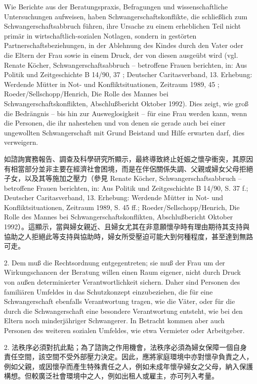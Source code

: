 \documentclass[12pt]{article}
\begin{document}
\begin{sourcepara}[title={原文D.153}]
Wie Berichte aus der Beratungspraxis, Befragungen und wissenschaftliche Untersuchungen aufweisen, haben Schwangerschaftskonflikte, die schließlich zum Schwangerschaftsabbruch führen, ihre Ursache zu einem erheblichen Teil nicht primär in wirtschaftlich-sozialen Notlagen, sondern in gestörten Partnerschaftsbeziehungen, in der Ablehnung des Kindes durch den Vater oder die Eltern der Frau sowie in einem Druck, der von diesen ausgeübt wird (vgl. Renate Köcher, Schwangerschaftsabbruch -- betroffene Frauen berichten, in: Aus Politik und Zeitgeschichte B 14/90, \abbrS{} 37 \abbrF{}; Deutscher Caritasverband, 13. Erhebung: Werdende Mütter in Not- und Konfliktsituationen, Zeitraum 1989, \abbrS{} 45 \abbrFF{}; Roeder/Sellschopp/Henrich, Die Rolle des Mannes bei Schwangerschaftskonflikten, Abschlußbericht Oktober 1992). Dies zeigt, wie groß die Bedrängnis -- bis hin zur Ausweglosigkeit -- für eine Frau werden kann, wenn die Personen, die ihr nahestehen und von denen sie gerade auch bei einer ungewollten Schwangerschaft mit Grund Beistand und Hilfe erwarten darf, dies verweigern.
\end{sourcepara}
\begin{transpara}
如諮詢實務報告、調查及科學研究所顯示，最終導致終止妊娠之懷孕衝突，其原因有相當部分並非主要在經濟社會困境，而是在伴侶關係失調、父親或婦女父母拒絕子女，以及其等施加之壓力（參見 Renate Köcher, Schwangerschaftsabbruch -- betroffene Frauen berichten, in: Aus Politik und Zeitgeschichte B 14/90, S. 37 f.; Deutscher Caritasverband, 13. Erhebung: Werdende Mütter in Not- und Konfliktsituationen, Zeitraum 1989, S. 45 ff.; Roeder/Sellschopp/Henrich, Die Rolle des Mannes bei Schwangerschaftskonflikten, Abschlußbericht Oktober 1992）。這顯示，當與婦女親近、且婦女尤其在非意願懷孕時有理由期待其支持與協助之人拒絕此等支持與協助時，婦女所受壓迫可能大到何種程度，甚至達到無路可走。
\end{transpara}

\begin{sourcepara}[title={原文D.154}]
2. Dem muß die Rechtsordnung entgegentreten; sie muß der Frau um der Wirkungschancen der Beratung willen einen Raum eigener, nicht durch Druck von außen determinierter Verantwortlichkeit sichern. Daher sind Personen des familiären Umfeldes in das Schutzkonzept einzubeziehen, die für eine Schwangerschaft ebenfalls Verantwortung tragen, wie die Väter, oder für die durch die Schwangerschaft eine besondere Verantwortung entsteht, wie bei den Eltern noch minderjähriger Schwangerer. In Betracht kommen aber auch Personen des weiteren sozialen Umfeldes, wie etwa Vermieter oder Arbeitgeber.
\end{sourcepara}
\begin{transpara}
2. 法秩序必須對抗此點；為了諮詢之作用機會，法秩序必須為婦女保障一個自身責任空間，該空間不受外部壓力決定。因此，應將家庭環境中亦對懷孕負責之人，例如父親，或因懷孕而產生特殊責任之人，例如未成年懷孕婦女之父母，納入保護構想。但較廣泛社會環境中之人，例如出租人或雇主，亦可列入考量。
\end{transpara}
\end{document}
